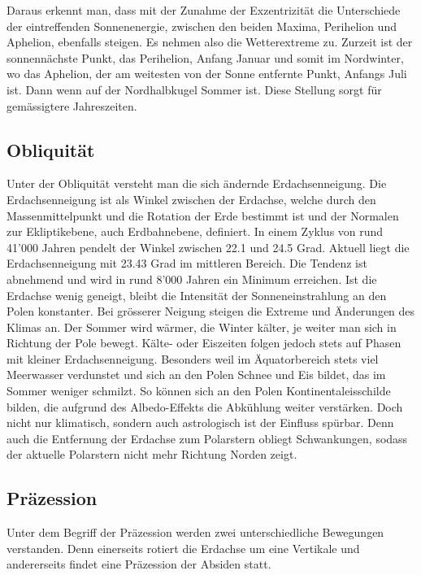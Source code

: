 Daraus erkennt man, dass mit der Zunahme der Exzentrizität die Unterschiede der eintreffenden Sonnenenergie, zwischen den beiden Maxima, Perihelion und Aphelion, ebenfalls steigen.
Es nehmen also die Wetterextreme zu.
Zurzeit ist der sonnennächste Punkt, das Perihelion, Anfang Januar und somit im Nordwinter, wo das Aphelion, der am weitesten von der Sonne entfernte Punkt, Anfangs Juli ist.
Dann wenn auf der Nordhalbkugel Sommer ist.
Diese Stellung sorgt für gemässigtere Jahreszeiten. 

\subsection{Obliquität
\label{milankovic:subsection:Obliquität}}
Unter der Obliquität versteht man die sich ändernde Erdachsenneigung.
Die Erdachsenneigung ist als Winkel zwischen der Erdachse, welche durch den Massenmittelpunkt und die Rotation der Erde bestimmt ist und der Normalen zur Ekliptikebene, auch Erdbahnebene, definiert.
In einem Zyklus von rund 41'000 Jahren pendelt der Winkel zwischen 22.1 und 24.5 Grad.
Aktuell liegt die Erdachsenneigung mit 23.43 Grad im mittleren Bereich.
Die Tendenz ist abnehmend und wird in rund 8’000 Jahren ein Minimum erreichen.
Ist die Erdachse wenig geneigt, bleibt die Intensität der Sonneneinstrahlung an den Polen konstanter.
Bei grösserer Neigung steigen die Extreme und Änderungen des Klimas an.
Der Sommer wird wärmer, die Winter kälter, je weiter man sich in Richtung der Pole bewegt.
Kälte- oder Eiszeiten folgen jedoch stets auf Phasen mit kleiner Erdachsenneigung.
Besonders weil im Äquatorbereich stets viel Meerwasser verdunstet und sich an den Polen Schnee und Eis bildet, das im Sommer weniger schmilzt.
So können sich an den Polen Kontinentaleisschilde bilden, die aufgrund des Albedo-Effekts die Abkühlung weiter verstärken.
Doch nicht nur klimatisch, sondern auch astrologisch ist der Einfluss spürbar.
Denn auch die Entfernung der Erdachse zum Polarstern obliegt Schwankungen, sodass der aktuelle Polarstern nicht mehr Richtung Norden zeigt.

\subsection{Präzession
\label{milankovic:subsection:Präzession}}
Unter dem Begriff der Präzession werden zwei unterschiedliche Bewegungen verstanden.
Denn einerseits rotiert die Erdachse um eine Vertikale und andererseits findet eine Präzession der Absiden statt. 

